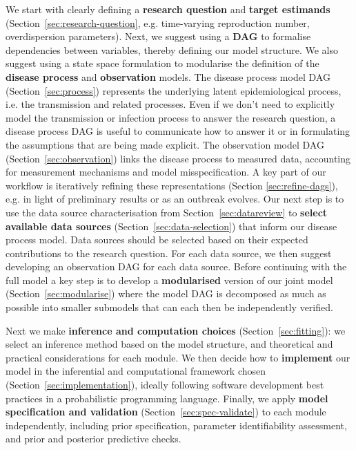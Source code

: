 \documentclass{article}
\begin{document}
We start with clearly defining a \textbf{research question} and \textbf{target estimands} (Section~\ref{sec:research-question}, e.g. time-varying reproduction number, overdispersion parameters). Next, we suggest using a \textbf{\ac{DAG}} to formalise dependencies between variables, thereby defining our model structure. We also suggest using a state space formulation \citep{birrell2018evidence} to modularise the definition of the \textbf{disease process} and \textbf{observation} models. The disease process model \ac{DAG} (Section~\ref{sec:process}) represents the underlying latent epidemiological process, i.e. the transmission and related processes. Even if we don't need to explicitly model the transmission or infection process to answer the research question, a disease process \ac{DAG} is useful to communicate how to answer it or in formulating the assumptions that are being made explicit. The observation model \ac{DAG} (Section~\ref{sec:observation}) links the disease process to measured data, accounting for measurement mechanisms and model misspecification. A key part of our workflow is iteratively refining these representations (Section \ref{sec:refine-dags}), e.g. in light of preliminary results or as an outbreak evolves. 
Our next step is to use the data source characterisation from Section~\ref{sec:datareview} to \textbf{select available data sources} (Section~\ref{sec:data-selection}) that inform our disease process model. Data sources should be selected based on their expected contributions to the research question. For each data source, we then suggest developing an observation \ac{DAG} for each data source.
Before continuing with the full model a key step is to develop a \textbf{modularised} version of our joint model (Section~\ref{sec:modularise}) where the model \ac{DAG} is decomposed as much as possible into smaller submodels that can each then be independently verified.

Next we make \textbf{inference and computation choices} (Section~\ref{sec:fitting}): we select an inference method based on the model structure, and theoretical and practical considerations for each module.
We then decide how to \textbf{implement} our model in the inferential and computational framework chosen (Section~\ref{sec:implementation}), ideally following software development best practices in a probabilistic programming language.
Finally, we apply \textbf{model specification and validation} (Section~\ref{sec:spec-validate}) to each module independently, including prior specification, parameter identifiability assessment, and prior and posterior predictive checks.
\end{document}
